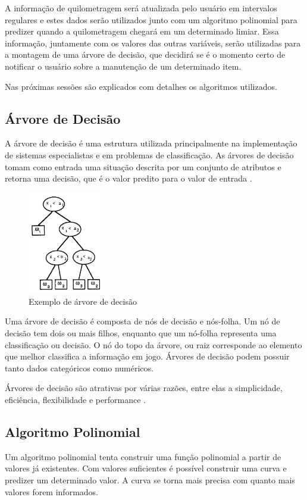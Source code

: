 \documentclass[12pt]{article}
\begin{document}
A informação de quilometragem será atualizada pelo usuário em intervalos
regulares e estes dados serão utilizados junto com um algoritmo polinomial
para predizer quando a quilometragem chegará em um determinado limiar. Essa
informação, juntamente com os valores das outras variáveis, serão utilizadas
para a montagem de uma árvore de decisão, que decidirá se é o momento certo de
notificar o usuário sobre a manutenção de um determinado item.

Nas próximas sessões são explicados com detalhes os algoritmos utilizados.

\subsection{Árvore de Decisão}\label{sec:arvorededecisao}
A árvore de decisão é uma estrutura utilizada principalmente na implementação de
sistemas especialistas e em problemas de classificação. As árvores de decisão
tomam como entrada uma situação descrita por um conjunto de atributos e retorna
uma decisão, que é o valor predito para o valor de entrada \cite{russell2003}.

\begin{figure}[h]
\centering
\includegraphics[width=0.3\textwidth]{arvorededecisao}
\caption{Exemplo de árvore de decisão \cite{safavian1991survey}}
\label{arvorededecisao}
\end{figure}

Uma árvore de decisão é composta de nós de decisão e nós-folha. Um nó de decisão
tem dois ou mais filhos, enquanto que um nó-folha representa uma classificação
ou decisão. O nó do topo da árvore, ou raiz corresponde ao elemento que melhor
classifica a informação em jogo. Árvores de decisão podem possuir tanto dados
categóricos como numéricos.

Árvores de decisão são atrativas por várias razões, entre elas a simplicidade,
eficiência, flexibilidade e performance \cite{safavian1991survey}.

\subsection{Algoritmo Polinomial}
Um algoritmo polinomial tenta construir uma função polinomial a partir de
valores já existentes. Com valores suficientes é possível construir uma curva
e predizer um determinado valor. A curva se torna mais precisa com quanto mais
valores forem informados.



%
\end{document}
